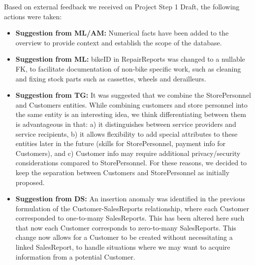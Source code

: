 \documentclass{article}
\begin{document}
\begin{tcolorbox}[colback=secondarycolor, colframe=primarycolor, arc=5mm]
Based on external feedback we received on Project Step 1 Draft, the following actions were taken:
\vspace{0.2cm}
\begin{itemize}
  \item \textbf{Suggestion from ML/AM:} Numerical facts have been added to the overview to provide context and establish the scope of the database.
  \vspace{0.1cm}
  \item \textbf{Suggestion from ML:} bikeID in RepairReports was changed to a nullable FK, to facilitate documentation of non-bike specific work, such as cleaning and fixing stock parts such as cassettes, wheels and derailleurs.
  \vspace{0.1cm}
  \item \textbf{Suggestion from TG:} It was suggested that we combine the StorePersonnel and Customers entities. While combining customers and store personnel into the same entity is an interesting idea, we think differentiating between them is advantageous in that: a) it distinguishes between service providers and service recipients, b) it allows flexibility to add special attributes to these entities later in the future (skills for StorePersonnel, payment info for Customers), and c) Customer info may require additional privacy/security considerations compared to StorePersonnel. For these reasons, we decided to keep the separation between Customers and StorePersonnel as initially proposed.
  \vspace{0.1cm}
  \item \textbf{Suggestion from DS:} An insertion anomaly was identified in the previous formulation of the Customer-SalesReports relationship, where each Customer corresponded to one-to-many SalesReports. This has been altered here such that now each Customer corresponds to zero-to-many SalesReports. This change now allows for a Customer to be created without necessitating a linked SalesReport, to handle situations where we may want to acquire information from a potential Customer. 
\end{itemize}
\vspace{0.2cm}
\end{tcolorbox}

\vspace{1cm}

\end{document}
